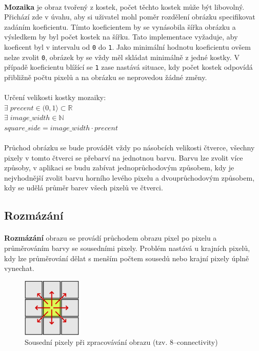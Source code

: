 \documentclass[12pt]{scrartcl}
\begin{document}
\paragraph{}
\textbf{Mozaika} je obraz tvořený z kostek, počet těchto kostek může být libovolný. Přichází zde v úvahu, aby si uživatel mohl poměr rozdělení obrázku specifikovat zadáním koeficientu. Tímto koeficientem by se vynásobila šířka obrázku a výsledkem by byl počet kostek na šířku. Tato implementace vyžaduje, aby koeficent byl v intervalu od \texttt{0} do \texttt{1}. Jako minimální hodnotu koeficientu ovšem nelze zvolit \texttt{0}, obrázek by se vždy měl skládat minimálně z jedné kostky. V případě koeficientu blížící se \texttt{1} zase nastává situace, kdy počet kostek odpovídá přibližně počtu pixelů a na obrázku se neprovedou žádné změny. \\\\
Určení velikosti kostky mozaiky:\\
$\exists \; precent \in (0,1 \rangle \subset{\mathbb{R}} $\\
$\exists \; image\_width \in \mathbb{N} $\\
$ square\_side = image\_width \cdot precent $

\paragraph{}
Průchod obrázku se bude provádět vždy po násobcích velikosti čtverce, všechny pixely v tomto čtverci se přebarví na jednotnou barvu. Barvu lze zvolit více způsoby, v aplikaci se budu zabívat jednoprůchodovým způsobem, kdy je nejvhodnější zvolit barvu horního levého pixelu a dvouprůchodovým způsobem, kdy se udělá průměr barev všech pixelů ve čtverci.

\subsection{Rozmázání}
\paragraph{}
\textbf{Rozmázání} obrazu se provádí průchodem obrazu pixel po pixelu a průměrováním barvy se sousedními pixely. Problém nastává u krajních pixelů, kdy lze průměrování dělat s menším počtem sousedů nebo krajní pixely úplně vynechat.

\begin{figure}[!ht]
	\centering
	\label{obr:connectivity}
	\includegraphics[width=0.25\textwidth,natwidth=1,natheight=1]{8-connectivity.pdf}
	\caption{Sousední pixely při zpracovávání obrazu (tzv. 8–connectivity)}
\end{figure}	
\end{document}
